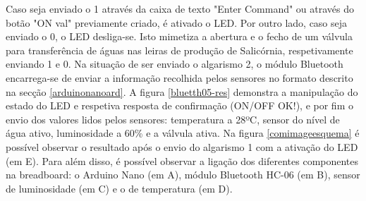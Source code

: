 Caso seja enviado o 1 através da caixa de texto "Enter Command" ou através do botão "ON val" previamente criado, é ativado o LED. Por outro lado, caso seja enviado o 0,  o LED desliga-se. Isto mimetiza a abertura e o fecho de um válvula para transferência de águas nas leiras de produção de Salicórnia, respetivamente enviando 1 e 0. Na situação de ser enviado o algarismo 2, o módulo Bluetooth encarrega-se de enviar a informação recolhida pelos sensores no formato descrito na secção \ref{arduinonanoard}. A figura \ref{bluetth05-res} demonstra a manipulação do estado do LED e respetiva resposta de confirmação (ON/OFF OK!), e por fim o envio dos valores lidos pelos sensores: temperatura a 28ºC, sensor do nível de água ativo, luminosidade a 60\% e a válvula ativa. Na figura \ref{comimageesquema} é possível observar o resultado após o envio do algarismo 1 com a ativação do LED (em E). Para além disso, é possível observar a ligação dos diferentes componentes na breadboard: o Arduino Nano (em A), módulo Bluetooth HC-06 (em B), sensor de luminosidade (em C) e o de temperatura (em D). 






